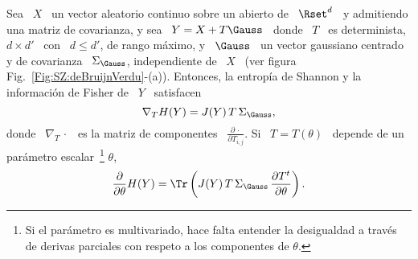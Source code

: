 \begin{teorema}
  Sea \ $X$ \  un vector aleatorio continuo sobre un abierto  de \ $\Rset^d$ \ y
  admitiendo una matriz de covarianza, y sea \  $Y = X + T \Gauss$ \ donde \ $T$
  \ es determinista, $d  \times d'$ \ con \ $ d \le d'$,  de rango m\'aximo, y \
  $\Gauss$ \  un vector  gaussiano centrado y  de covarianza  \ $\Sigma_\Gauss$,
  independiente  de \  $X$ \  (ver  figura Fig.~\ref{Fig:SZ:deBruijnVerdu}-(a)).
  Entonces, la  entrop\'ia de Shannon  y la informaci\'on  de Fisher de \  $Y$ \
  satisfacen
  \[
  \nabla_T H(Y) = J(Y) \, T \, \Sigma_\Gauss,
  \]
  donde \ $\nabla_T \, \cdot$ \ es la matriz de componentes \ $\frac{\partial \,
    \cdot}{\partial T_{i,j}}$.  Si \ $T = T(\theta)$ \ depende de un par\'ametro
  escalar~\footnote{Si el  par\'ametro es  multivariado, hace falta  entender la
    desigualdad a trav\'es de derivas parciales con respeto a los componentes de
    $\theta$.}  $\theta$,
  \[
  \frac{\partial}{\partial \theta}  H(Y) = \Tr\left( J(Y) \,  T \, \Sigma_\Gauss
    \, \frac{\partial T^t}{\partial \theta} \right).
  \]
\end{teorema}
%
